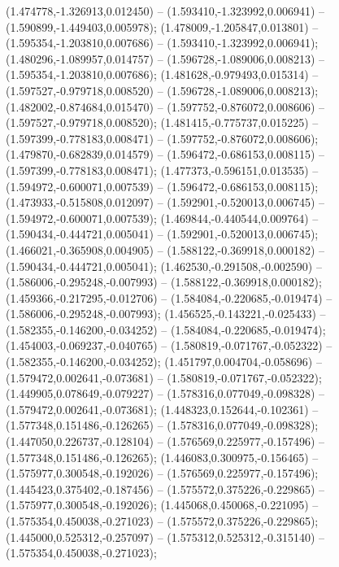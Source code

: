  (1.474778,-1.326913,0.012450) -- (1.593410,-1.323992,0.006941) -- (1.590899,-1.449403,0.005978);
 (1.478009,-1.205847,0.013801) -- (1.595354,-1.203810,0.007686) -- (1.593410,-1.323992,0.006941);
 (1.480296,-1.089957,0.014757) -- (1.596728,-1.089006,0.008213) -- (1.595354,-1.203810,0.007686);
 (1.481628,-0.979493,0.015314) -- (1.597527,-0.979718,0.008520) -- (1.596728,-1.089006,0.008213);
 (1.482002,-0.874684,0.015470) -- (1.597752,-0.876072,0.008606) -- (1.597527,-0.979718,0.008520);
 (1.481415,-0.775737,0.015225) -- (1.597399,-0.778183,0.008471) -- (1.597752,-0.876072,0.008606);
 (1.479870,-0.682839,0.014579) -- (1.596472,-0.686153,0.008115) -- (1.597399,-0.778183,0.008471);
 (1.477373,-0.596151,0.013535) -- (1.594972,-0.600071,0.007539) -- (1.596472,-0.686153,0.008115);
 (1.473933,-0.515808,0.012097) -- (1.592901,-0.520013,0.006745) -- (1.594972,-0.600071,0.007539);
 (1.469844,-0.440544,0.009764) -- (1.590434,-0.444721,0.005041) -- (1.592901,-0.520013,0.006745);
 (1.466021,-0.365908,0.004905) -- (1.588122,-0.369918,0.000182) -- (1.590434,-0.444721,0.005041);
 (1.462530,-0.291508,-0.002590) -- (1.586006,-0.295248,-0.007993) -- (1.588122,-0.369918,0.000182);
 (1.459366,-0.217295,-0.012706) -- (1.584084,-0.220685,-0.019474) -- (1.586006,-0.295248,-0.007993);
 (1.456525,-0.143221,-0.025433) -- (1.582355,-0.146200,-0.034252) -- (1.584084,-0.220685,-0.019474);
 (1.454003,-0.069237,-0.040765) -- (1.580819,-0.071767,-0.052322) -- (1.582355,-0.146200,-0.034252);
 (1.451797,0.004704,-0.058696) -- (1.579472,0.002641,-0.073681) -- (1.580819,-0.071767,-0.052322);
 (1.449905,0.078649,-0.079227) -- (1.578316,0.077049,-0.098328) -- (1.579472,0.002641,-0.073681);
 (1.448323,0.152644,-0.102361) -- (1.577348,0.151486,-0.126265) -- (1.578316,0.077049,-0.098328);
 (1.447050,0.226737,-0.128104) -- (1.576569,0.225977,-0.157496) -- (1.577348,0.151486,-0.126265);
 (1.446083,0.300975,-0.156465) -- (1.575977,0.300548,-0.192026) -- (1.576569,0.225977,-0.157496);
 (1.445423,0.375402,-0.187456) -- (1.575572,0.375226,-0.229865) -- (1.575977,0.300548,-0.192026);
 (1.445068,0.450068,-0.221095) -- (1.575354,0.450038,-0.271023) -- (1.575572,0.375226,-0.229865);
 (1.445000,0.525312,-0.257097) -- (1.575312,0.525312,-0.315140) -- (1.575354,0.450038,-0.271023);
